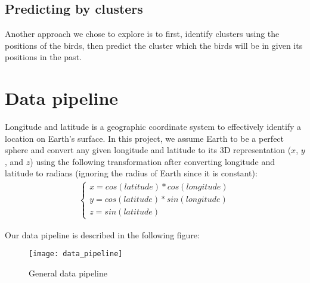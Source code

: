\documentclass[10pt,conference]{IEEEtran}
\begin{document}
\subsection{Predicting by clusters}
    Another approach we chose to explore is to first, identify clusters using the positions of the birds, then predict the cluster which the birds will be in given its positions in the past. 

\section{Data pipeline}
    Longitude and latitude is a geographic coordinate system to effectively identify a location on Earth's surface. In this project, we assume Earth to be a perfect sphere and convert any given longitude and latitude to its 3D representation ($x$, $y$, and $z$) using the following transformation after converting longitude and latitude to radians (ignoring the radius of Earth since it is constant):
    \begin{align}
    \begin{cases}
        x = cos(latitude) * cos(longitude) \\
        y = cos(latitude) * sin(longitude) \\
        z = sin(latitude)
    \end{cases}
    \end{align}

    Our data pipeline is described in the following figure:
    \begin{figure}[h!]
      \centering
        \texttt{[image: data\_pipeline]} 
      \caption{General data pipeline}
      \label{fig:data_pipeline}
    \end{figure}
    
\end{document}
